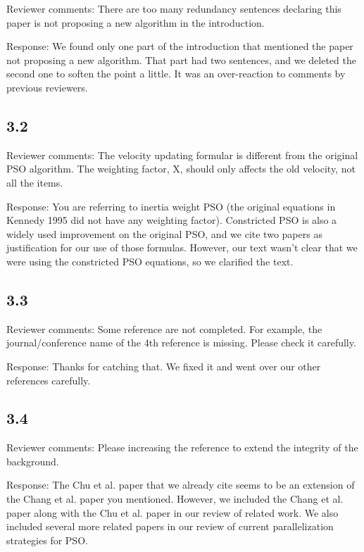 \documentclass[onecolumn, 12pt]{article}
\begin{document}
Reviewer comments: There are too many redundancy sentences declaring this paper
is not proposing a new algorithm in the introduction.

Response: We found only one part of the introduction that mentioned the paper
not proposing a new algorithm.  That part had two sentences, and we deleted the
second one to soften the point a little.  It was an over-reaction to comments
by previous reviewers.

\subsection*{3.2}

Reviewer comments: The velocity updating formular is different from the
original PSO algorithm.  The weighting factor, X, should only affects the old
velocity, not all the items.

Response: You are referring to inertia weight PSO (the original equations in
Kennedy 1995 did not have any weighting factor).  Constricted PSO is also a
widely used improvement on the original PSO, and we cite two papers as
justification for our use of those formulas.  However, our text wasn't clear
that we were using the constricted PSO equations, so we clarified the text.

\subsection*{3.3}

Reviewer comments: Some reference are not completed. For example, the
journal/conference name of the 4th reference is missing. Please check it
carefully.

Response: Thanks for catching that.  We fixed it and went over our other
references carefully.

\subsection*{3.4}

Reviewer comments: Please increasing the reference to extend the integrity of
the background.

Response: The Chu et al. paper that we already cite seems to be an extension of
the Chang et al. paper you mentioned.  However, we included the Chang et al.
paper along with the Chu et al. paper in our review of related work.  We also
included several more related papers in our review of current parallelization
strategies for PSO.
\end{document}
